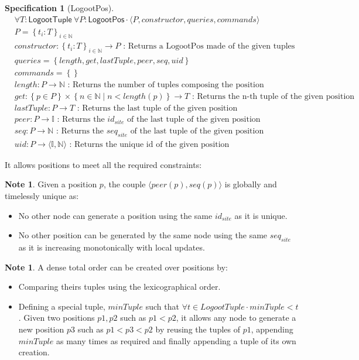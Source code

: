 \documentclass{article}
\newcommand{\commands}[1]{commands = \set{#1}}
\newcommand{\fnspec}[3]{#1: #2 \text{ : #3}}
\newcommand{\inbb}[1]{\in \mathbb{#1}}
\newcommand{\mathlist}[2]{\set{#1_i: #2}_{i \inbb{N}}}
\newcommand{\queries}[1]{queries = \set{#1}}
\newcommand{\set}[1]{\left\{#1\right\}} %
\newcommand{\spectuple}[1]{\tuple{#1, constructor, queries, commands}}
\newcommand{\ssep}{\mid} %
\newcommand{\tuple}[1]{\langle #1 \rangle}
\theoremstyle{definition}
\newcounter{note-counter}
\theoremstyle{definition}
\newtheorem{note}[note-counter]{Note}
\theoremstyle{definition}
\newcounter{specificationcounter}
\theoremstyle{definition}
\newtheorem{specification}[specificationcounter]{Specification}
\begin{document}
\begin{specification}[LogootPos]
    \begin{align*}
    &\forall T: \mathsf{LogootTuple} \ \forall P: \mathsf{LogootPos} \cdot \spectuple{P}\\
    &P = \mathlist{t}{T}\\
    &\fnspec{constructor}{\mathlist{t}{T} \to P}{Returns a LogootPos made of the given tuples}\\
    &\queries{length, get, lastTuple, peer, seq, uid}\\
    &\commands{}\\
    &\fnspec{length}{P \to \mathbb{N}}{Returns the number of tuples composing the position}\\
    &\fnspec{get}{\set{p \in P} \times \set{n \inbb{N} \ssep n < length(p)} \to T}{Returns the n-th tuple of the given position}\\
    &\fnspec{lastTuple}{P \to T}{Returns the last tuple of the given position}\\
    &\fnspec{peer}{P \to \mathbb{I}}{Returns the $id_{site}$ of the last tuple of the given position}\\
    &\fnspec{seq}{P \to \mathbb{N}}{Returns the $seq_{site}$ of the last tuple of the given position}\\
    &\fnspec{uid}{P \to \tuple{\mathbb{I}, \mathbb{N}}}{Returns the unique id of the given position}
    \end{align*}
    \label{spec:logoot-pos}
\end{specification}

It allows positions to meet all the required constraints:
\begin{note}
    Given a position $p$, the couple $\tuple{peer(p), seq(p)}$ is globally and timelessly unique as:
    \begin{itemize}
        \item No other node can generate a position using the same $id_{site}$ as it is unique.
        \item No other position can be generated by the same node using the same $seq_{site}$ as it is increasing monotonically with local updates.
    \end{itemize}
\end{note}

\begin{note}
    A dense total order can be created over positions by:
    \begin{itemize}
        \item Comparing theirs tuples using the lexicographical order.
        \item Defining a special tuple, $minTuple$ such that $\forall t \in LogootTuple \cdot minTuple < t$.
        Given two positions $p1, p2$ such as $p1 < p2$, it allows any node to generate a new position $p3$ such as $p1 < p3 < p2$ by reusing the tuples of $p1$, appending $minTuple$ as many times as required and finally appending a tuple of its own creation.
    \end{itemize}
\end{note}
\end{document}
